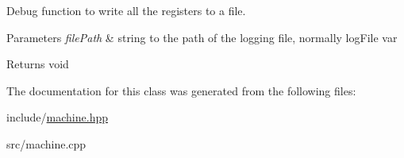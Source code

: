 Debug function to write all the registers to a file. 


\begin{DoxyParams}{Parameters}
{\em file\+Path} & string to the path of the logging file, normally log\+File var \\
\hline
\end{DoxyParams}
\begin{DoxyReturn}{Returns}
void 
\end{DoxyReturn}


The documentation for this class was generated from the following files\+:\begin{DoxyCompactItemize}
\item 
include/\hyperlink{machine_8hpp}{machine.\+hpp}\item 
src/machine.\+cpp\end{DoxyCompactItemize}
